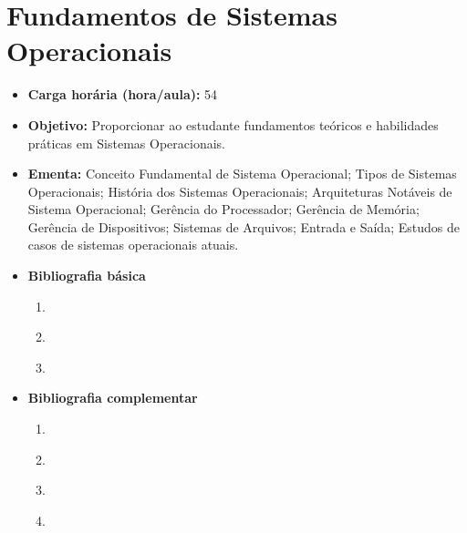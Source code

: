 \documentclass[
	10pt,				%
	openright,			%
	twoside,			%
	a4paper,			%
	english,			%
	french,				%
	brazil,				%
	sumario=tradicional
]{abntex2}
\begin{document}


\newpage
\section*{Fundamentos de Sistemas Operacionais}\label{2_sistop}
\begin{itemize}
	\item \textbf{Carga horária (hora/aula):} 54
	\item \textbf{Objetivo:} Proporcionar ao estudante fundamentos teóricos e habilidades práticas em Sistemas Operacionais.
	\item \textbf{Ementa:} 
	Conceito Fundamental de Sistema Operacional; 
	Tipos de Sistemas Operacionais; 
	História dos Sistemas Operacionais; 
	Arquiteturas Notáveis de Sistema Operacional; 
	Gerência do Processador; 
	Gerência de Memória; 
	Gerência de Dispositivos; 
	Sistemas de Arquivos; 
	Entrada e Saída;
	Estudos de casos de sistemas operacionais atuais.
	\item \textbf{Bibliografia básica}
	\begin{enumerate}
		\item \cite{tanenbaum2010}
		\item \cite{laureanoolsen2010}
		\item \cite{oliveiraromulo2010}
	\end{enumerate}
	\item \textbf{Bibliografia complementar}
	\begin{enumerate}
		\item \cite{tanenbaum2008}
		\item \cite{deiteldeitelchoffnes2010}
		\item \cite{machadomaia2013}
		\item \cite{smith2004}
	\end{enumerate}	
\end{itemize}


\newpage
\end{document}
